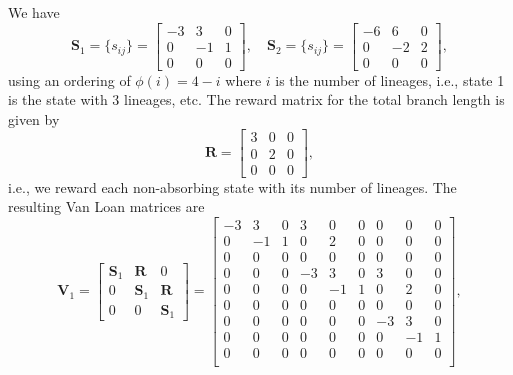 \documentclass[hidelinks,11pt]{article}
\begin{document}
    We have
    \begin{equation*}
        \mathbf{S}_1 = \{s_{ij}\} =
        \begin{bmatrix}
            -3 & 3 & 0 \\ 0 & -1 & 1 \\ 0 & 0 & 0
        \end{bmatrix}, \quad
        \mathbf{S}_2 = \{s_{ij}\} =
        \begin{bmatrix}
            -6 & 6 & 0 \\ 0 & -2 & 2 \\ 0 & 0 & 0
        \end{bmatrix},
    \end{equation*}
    using an ordering of $\phi(i) = 4-i$ where $i$ is the number of lineages, i.e., state 1 is the state with 3 lineages, etc.
    The reward matrix for the total branch length is given by
    \begin{equation*}
        \mathbf{R} = \begin{bmatrix}
                         3 & 0 & 0 \\ 0 & 2 & 0 \\ 0 & 0 & 0
        \end{bmatrix},
    \end{equation*}
    i.e., we reward each non-absorbing state with its number of lineages.
    The resulting Van Loan matrices are
    \begin{equation*}
        \mathbf{V}_1 = \begin{bmatrix}
                           \mathbf{S}_1 & \mathbf{R} & 0 \\ 0 & \mathbf{S}_1 & \mathbf{R} \\ 0 & 0 & \mathbf{S}_1
        \end{bmatrix} = \left [
            \begin{array}{ccc|ccc|ccc}
                -3 & 3  & 0 & 3  & 0  & 0 & 0  & 0  & 0 \\
                0  & -1 & 1 & 0  & 2  & 0 & 0  & 0  & 0 \\
                0  & 0  & 0 & 0  & 0  & 0 & 0  & 0  & 0 \\
                \hline
                0  & 0  & 0 & -3 & 3  & 0 & 3  & 0  & 0 \\
                0  & 0  & 0 & 0  & -1 & 1 & 0  & 2  & 0 \\
                0  & 0  & 0 & 0  & 0  & 0 & 0  & 0  & 0 \\
                \hline
                0  & 0  & 0 & 0  & 0  & 0 & -3 & 3  & 0 \\
                0  & 0  & 0 & 0  & 0  & 0 & 0  & -1 & 1 \\
                0  & 0  & 0 & 0  & 0  & 0 & 0  & 0  & 0 \\
            \end{array}
            \right ],
    \end{equation*}
\end{document}

